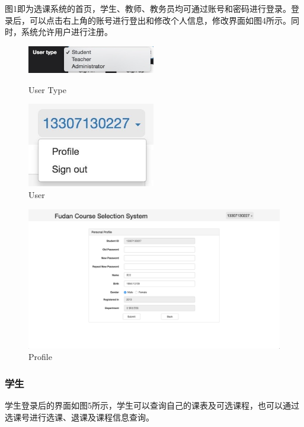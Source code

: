 \documentclass[a4paper, 11pt, nofonts, nocap, fancyhdr]{ctexart}
\begin{document}
	图1即为选课系统的首页，学生、教师、教务员均可通过账号和密码进行登录。登录后，可以点击右上角的账号进行登出和修改个人信息，修改界面如图4所示。同时，系统允许用户进行注册。

	\begin{figure}[ht]
		\begin{minipage}{0.5\textwidth}
			\centering
			\includegraphics[width=2.2in]{usertype}
			\caption{User Type}
		\end{minipage}%
		\begin{minipage}{0.5\textwidth}
			\centering
			\includegraphics[width=2.2in]{user}
			\caption{User}
		\end{minipage}
	\end{figure}

	\begin{figure}[ht]
		\centering
		\includegraphics[width=6in]{stupro}
		\caption{Profile}
	\end{figure}

\newpage
\subsubsection{学生}

	学生登录后的界面如图5所示，学生可以查询自己的课表及可选课程，也可以通过选课号进行选课、退课及课程信息查询。
\end{document}
